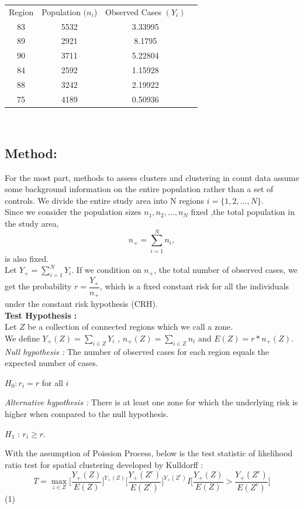 \documentclass[12pt]{article}
\begin{document}
		\begin{tabular}{|c|c|c|c|}
		\hline
		Region & Population $(n_i$)& Observed Cases $(Y_i)$ & \\ 
		83 & 5532& 3.33995 & \\
		89 & 2921& 8.1795 & \\
		90 & 3711& 5.22804 & \\
		84 & 2592& 1.15928 & \\
		88 & 3242& 2.19922 & \\
		75 & 4189& 0.50936 & \\
		\hline
		\end{tabular}\\
			
			\subsection{Method:} 

			For the most part, methods to assess clusters and clustering in count data assume some background information on the entire population rather than a set of controls. 
			We divide the entire study area into N regions $ i = \{1,2,\dots,N\}$. \\
			Since we consider the population sizes $n_1,n_2,\dots,n_N$ fixed ,the total population in the study area, \\
\[
n_+ = \sum_{i =1}^{N}n_i,
\]
is also fixed. \\
Let $Y_+ = \sum_{i=1}^{N} Y_i$. If we condition on $n_+$, the total number of observed cases, we get the probability $ r = \dfrac{Y_+}{n_+}$, which is a fixed constant risk for all the individuals under the constant risk hypothesis (CRH).\\
		
			\textbf{Test Hypothesis :} \\ 
			Let $Z$ be a collection of connected regions which we call a zone. \\
			We define $Y_+(Z) = \sum_{i \in Z} Y_i$ , $n_+(Z)=\sum_{i \in Z} n_i$ and $E(Z) = r*n_+(Z)$. \\
			
			\textit{Null hypothesis :} The number of observed cases for each region equals the expected number of cases. \\ 
			\begin{center}
			$H_0 : r_i = r$ for all $i$
			 \end{center}
			
			
			
			\textit{Alternative hypothesis :} There is at least one zone for which the underlying risk is higher when compared to the null hypothesis. \\
 			\begin{center}
			$H_1$ : $r_i \geq r$. \\
			\end{center}	
			With the assumption of Poission Process, below is the test statistic of likelihood ratio test for spatial clustering developed by Kulldorff : \\
				\[
					T = \max_{z\in Z} \bigg[\dfrac{Y_+(Z)}{E(Z)}\bigg]^{Y_+(Z)} \bigg[\dfrac{Y_+(Z^c)}{E(Z^c)}\bigg]^{Y_+(Z^c)} I\bigg[\dfrac{Y_+(Z)}{E(Z)} > \dfrac{Y_+(Z^c)}{E(Z^c)}\bigg]
				\]	  (1)
		
\end{document}
